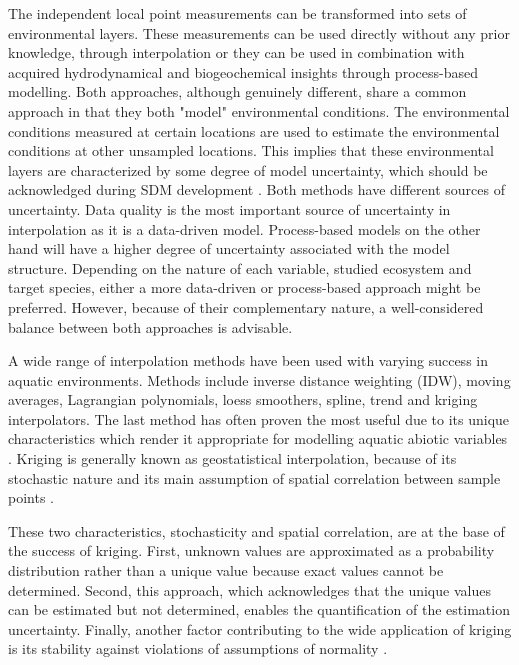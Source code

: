 \documentclass[12pt,authoryear]{elsarticle}
\begin{document}
The independent local point measurements can be transformed into sets of environmental layers. These measurements can be used directly without any prior knowledge, through interpolation or they can be used in combination with acquired hydrodynamical and biogeochemical insights through process-based modelling. Both approaches, although genuinely different, share a common approach in that they both "model" environmental conditions. The environmental conditions measured at certain locations are used to estimate the environmental conditions at other unsampled locations. This implies that these environmental layers are characterized by some degree of model uncertainty, which should be acknowledged during SDM development \citep{Fernandez2013}. Both methods have different sources of uncertainty. Data quality is the most important source of uncertainty in interpolation as it is a data-driven model. Process-based models on the other hand will have a higher degree of uncertainty associated with the model structure. Depending on the nature of each variable, studied ecosystem and target species, either a more data-driven or process-based approach might be preferred. However, because of their complementary nature, a well-considered balance between both approaches is advisable.

\vspace{5mm}

A wide range of interpolation methods have been used with varying success in aquatic environments. Methods include inverse distance weighting (IDW), moving averages, Lagrangian polynomials, loess smoothers, spline, trend and kriging interpolators. The last method has often proven the most useful due to its unique characteristics which render it appropriate for modelling aquatic abiotic variables \citep{Murphy2012,Rathbun1998}. Kriging is generally known as geostatistical interpolation, because of its stochastic nature and its main assumption of spatial correlation between sample points \citep{Calder2009}. 

These two characteristics, stochasticity and spatial correlation, are at the base of the success of kriging. First, unknown values are approximated as a probability distribution rather than a unique value because exact values cannot be determined. Second, this approach, which acknowledges that the unique values can be estimated but not determined, enables the quantification of the estimation uncertainty. Finally, another factor contributing to the wide application of kriging is its stability against violations of assumptions of normality \citep{Rathbun1998}.  
\end{document}
